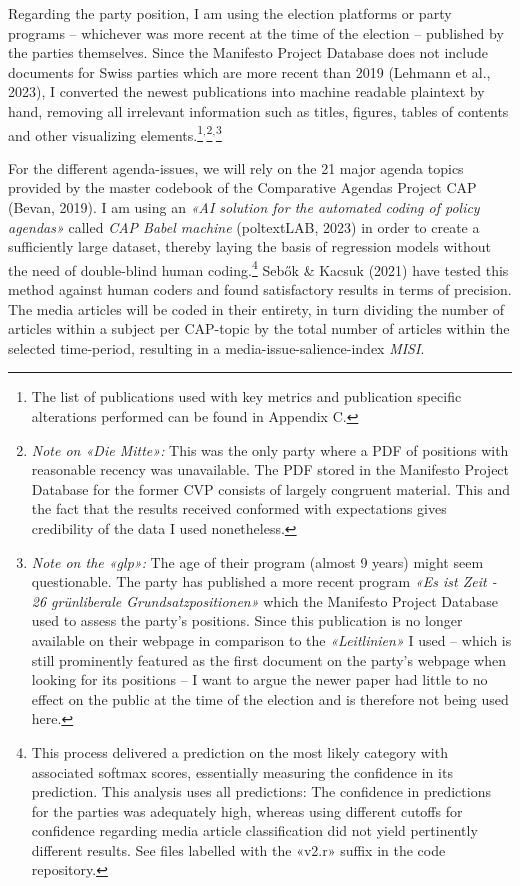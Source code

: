\documentclass[11pt,a4paper]{article}
\begin{document}
Regarding the party position, I am using the election platforms or party programs – whichever was more recent at the time of the election – published by the parties themselves. Since the Manifesto Project Database does not include documents for Swiss parties which are more recent than 2019 (Lehmann et al., 2023), I converted the newest publications into machine readable plaintext by hand, removing all irrelevant information such as titles, figures, tables of contents and other visualizing elements.\footnote{The list of publications used with key metrics and publication specific alterations performed can be found in Appendix C.}$^{, }$\footnote{\textit{Note on «Die Mitte»:} This was the only party where a PDF of positions with reasonable recency was unavailable. The PDF stored in the Manifesto Project Database for the former CVP consists of largely congruent material. This and the fact that the results received conformed with expectations gives credibility of the data I used nonetheless.}$^{, }$\footnote{\textit{Note on the «glp»:} The age of their program (almost 9 years) might seem questionable. The party has published a more recent program \textit{«Es ist Zeit - 26 grünliberale Grundsatzpositionen»} which the Manifesto Project Database used to assess the party’s positions. Since this publication is no longer available on their webpage in comparison to the \textit{«Leitlinien»} I used – which is still prominently featured as the first document on the party’s webpage when looking for its positions – I want to argue the newer paper had little to no effect on the public at the time of the election and is therefore not being used here.}

For the different agenda-issues, we will rely on the 21 major agenda topics provided by the master codebook of the Comparative Agendas Project CAP (Bevan, 2019). I am using an \textit{«AI solution for the automated coding of policy agendas»} called \textit{CAP Babel machine }(poltextLAB, 2023) in order to create a sufficiently large dataset, thereby laying the basis of regression models without the need of double-blind human coding.\footnote{This process delivered a prediction on the most likely category with associated softmax scores, essentially measuring the confidence in its prediction. This analysis uses all predictions: The confidence in predictions for the parties was adequately high, whereas using different cutoffs for confidence regarding media article classification did not yield pertinently different results. See files labelled with the «v2.r» suffix in the code repository.} Sebők \& Kacsuk (2021) have tested this method against human coders and found satisfactory results in terms of precision. The media articles will be coded in their entirety, in turn dividing the number of articles within a subject per CAP-topic by the total number of articles within the selected time-period, resulting in a media-issue-salience-index \textit{MISI}.
\end{document}

